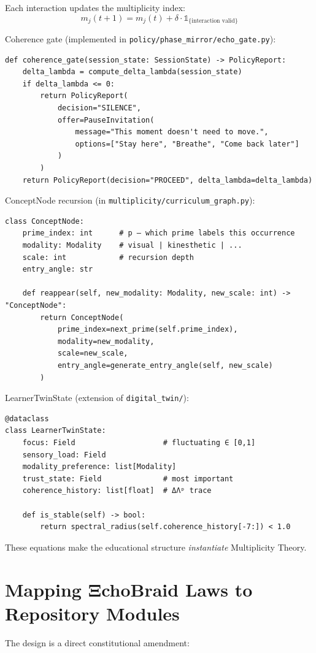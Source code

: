 \documentclass[11pt,letterpaper]{article}
\begin{document}
Each interaction updates the multiplicity index:
\[
m_j(t+1) = m_j(t) + \delta \cdot \mathbb{1}_{\{\text{interaction valid}\}}
\]

Coherence gate (implemented in \texttt{policy/phase\_mirror/echo\_gate.py}):
\begin{verbatim}
def coherence_gate(session_state: SessionState) -> PolicyReport:
    delta_lambda = compute_delta_lambda(session_state)
    if delta_lambda <= 0:
        return PolicyReport(
            decision="SILENCE",
            offer=PauseInvitation(
                message="This moment doesn't need to move.",
                options=["Stay here", "Breathe", "Come back later"]
            )
        )
    return PolicyReport(decision="PROCEED", delta_lambda=delta_lambda)
\end{verbatim}

ConceptNode recursion (in \texttt{multiplicity/curriculum\_graph.py}):
\begin{verbatim}
class ConceptNode:
    prime_index: int      # p — which prime labels this occurrence
    modality: Modality    # visual | kinesthetic | ...
    scale: int            # recursion depth
    entry_angle: str

    def reappear(self, new_modality: Modality, new_scale: int) -> "ConceptNode":
        return ConceptNode(
            prime_index=next_prime(self.prime_index),
            modality=new_modality,
            scale=new_scale,
            entry_angle=generate_entry_angle(self, new_scale)
        )
\end{verbatim}

LearnerTwinState (extension of \texttt{digital\_twin/}):
\begin{verbatim}
@dataclass
class LearnerTwinState:
    focus: Field                    # fluctuating ∈ [0,1]
    sensory_load: Field
    modality_preference: list[Modality]
    trust_state: Field              # most important
    coherence_history: list[float]  # ΔΛᵖ trace

    def is_stable(self) -> bool:
        return spectral_radius(self.coherence_history[-7:]) < 1.0
\end{verbatim}

These equations make the educational structure \emph{instantiate} Multiplicity Theory.

\section{Mapping ΞchoBraid Laws to Repository Modules}
The design is a direct constitutional amendment:
\end{document}
